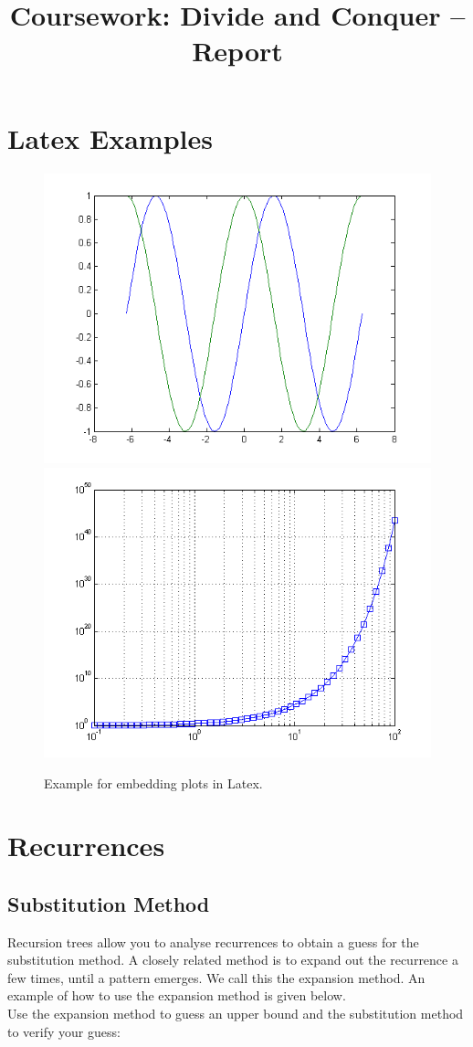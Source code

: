 \documentclass[a4paper]{article}
\title{Coursework: Divide and Conquer -- Report}
\begin{document}
\maketitle

\section*{Latex Examples}

\begin{figure}[h]

\includegraphics[width=0.48\linewidth]{example_plot1.png}
\includegraphics[width=0.48\linewidth]{example_plot2.png}

\caption{Example for embedding plots in Latex.}
\label{fig:examples}
\end{figure}


\section{Recurrences}

\subsection{Substitution Method}

Recursion trees allow you to analyse recurrences to obtain a guess for the substitution method. A closely related method is to expand out the recurrence a few times, until a pattern emerges. We call this the expansion method. An example of how to use the expansion method is given below.\\
\newline
Use the expansion method to guess an upper bound and the substitution method to verify your guess:
\end{document}
